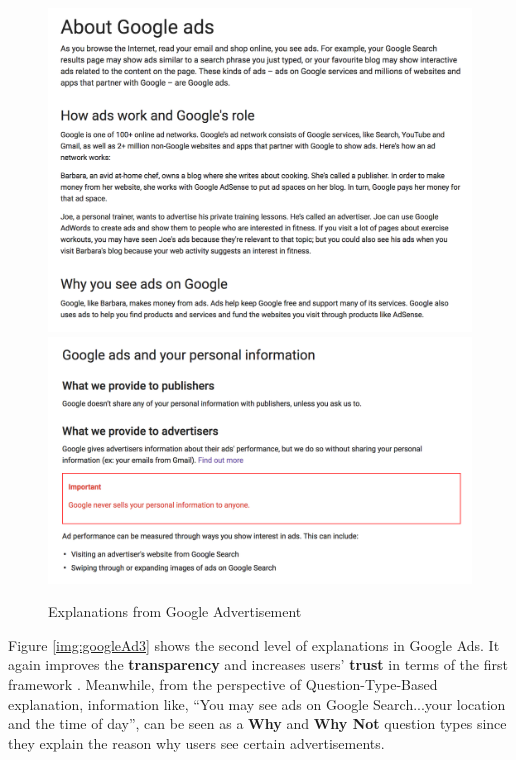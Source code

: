         \begin{figure}[H]
            \centering
            \captionsetup{justification=centering}
            \begin{mdframed}
                \includegraphics[width=1\textwidth]{img/googleAd2-1}
                \includegraphics[width=1\textwidth]{img/googleAd2-2}
            \end{mdframed}
            \caption{Explanations from Google Advertisement\cite{googleAd2}}
            \label{img:googleAd2}
        \end{figure}
        \indent
        Figure \ref{img:googleAd3} shows the second level of explanations in Google Ads. It again improves the \textbf{transparency} and increases users' \textbf{trust} in terms of the first framework . Meanwhile, from the perspective of Question-Type-Based explanation, information like, ``You may see ads on Google Search...your location and the time of day'', can be seen as a \textbf{Why} and \textbf{Why Not} question types since they explain the reason why users see certain advertisements.
